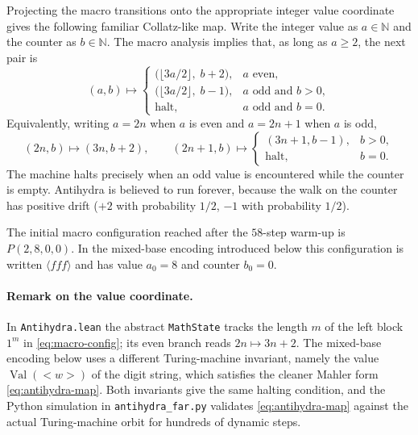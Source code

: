 \documentclass[11pt,a4paper]{article}
\theoremstyle{definition}
\newcommand{\lt}{<}
\newcommand{\gt}{>}
\newcommand{\Nat}{\mathbb{N}}
\newcommand{\val}{\operatorname{Val}}
\newcommand{\ones}[1]{1^{#1}}
\begin{document}
Projecting the macro transitions onto the appropriate integer value
coordinate gives the following familiar Collatz-like map.  Write the
integer value as $a\in\Nat$ and the counter as $b\in\Nat$.  The
macro analysis implies that, as long as $a\ge 2$, the next pair is
\begin{equation}
  \label{eq:antihydra-map}
  (a,b)\longmapsto
  \begin{cases}
    \bigl(\lfloor 3a/2\rfloor,\;b+2\bigr), & a\text{ even},\\[4pt]
    \bigl(\lfloor 3a/2\rfloor,\;b-1\bigr), & a\text{ odd and }b>0,\\[4pt]
    \text{halt}, & a\text{ odd and }b=0.
  \end{cases}
\end{equation}
Equivalently, writing $a=2n$ when $a$ is even and $a=2n+1$ when $a$ is
odd,
\begin{equation}
  \label{eq:antihydra-map-explicit}
  (2n,b)\mapsto(3n,b+2),
  \qquad
  (2n+1,b)\mapsto
  \begin{cases}
    (3n+1,b-1), & b>0,\\
    \text{halt}, & b=0.
  \end{cases}
\end{equation}
The machine halts precisely when an odd value is encountered while the
counter is empty.  Antihydra is believed to run forever, because the
walk on the counter has positive drift ($+2$ with probability $1/2$,
$-1$ with probability $1/2$).

The initial macro configuration reached after the $58$-step warm-up is
$P(2,8,0,0)$.  In the mixed-base encoding introduced below this
configuration is written $\langle fff\rangle$ and has value $a_0=8$ and
counter $b_0=0$.

\paragraph{Remark on the value coordinate.}
In \texttt{Antihydra.lean} the abstract \texttt{MathState} tracks the
length $m$ of the left block $\ones{m}$ in
\eqref{eq:macro-config}; its even branch reads $2n\mapsto 3n+2$.
The mixed-base encoding below uses a different Turing-machine invariant,
namely the value $\val(\lt w\gt)$ of the digit string, which satisfies
the cleaner Mahler form \eqref{eq:antihydra-map}.  Both invariants give
the same halting condition, and the Python simulation in
\texttt{antihydra\_far.py} validates \eqref{eq:antihydra-map} against the
actual Turing-machine orbit for hundreds of dynamic steps.
\end{document}
